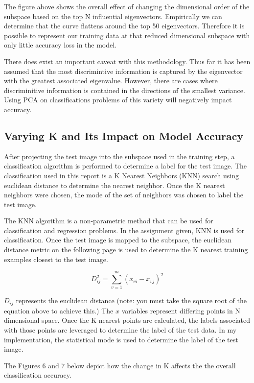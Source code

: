 \documentclass[12pt]{article}
\begin{document}
\noindent
The figure above shows the overall effect of changing the dimensional order of the subspace based on the top N influential eigenvectors. Empirically we can determine that the curve flattens around the top 50 eigenvectors. Therefore it is possible to represent our training data at that reduced dimensional subspace with only little accuracy loss in the model.

\bigbreak
\noindent
There does exist an important caveat with this methodology. Thus far it has been assumed that the most discrimintive information is captured by the eigenvector with the greatest associated eigenvalue. However, there are cases where discriminitive information is contained in the directions of the smallest variance. Using PCA on classifications problems of this variety will negatively impact accuracy.

\subsection{Varying K and Its Impact on Model Accuracy }

After projecting the test image into the subspace used in the training step, a classification algorithm is performed to determine a label for the test image. The classification used in this report is a K Nearest Neighbors (KNN) search using euclidean distance to determine the nearest neighbor. Once the K nearest neighbors were chosen, the mode of the set of neighbors was chosen to label the test image.

\bigbreak
\noindent
The KNN algorithm is a non-parametric method that can be used for classification and regression problems. In the assignment given, KNN is used for classification. Once the test image is mapped to the subspace, the euclidean distance metric on the following page is used to determine the K nearest training examples closest to the test image.

\[D_{ij}^2 = \sum_{v=1}^{m} (x_{vi}-x_{vj})^2 \]

\noindent
\(D_{ij}\) represents the euclidean distance (note: you must take the square root of the equation above to achieve this.) The \(x\) variables represent differing points in N dimensional space. Once the K nearest points are calculated, the labels associated with those points are leveraged to determine the label of the test data. In my implementation, the statistical mode is used to determine the label of the test image.

\bigbreak
\noindent
The Figures 6 and 7 below depict how the change in K affects the the overall classification accuracy.
\end{document}
